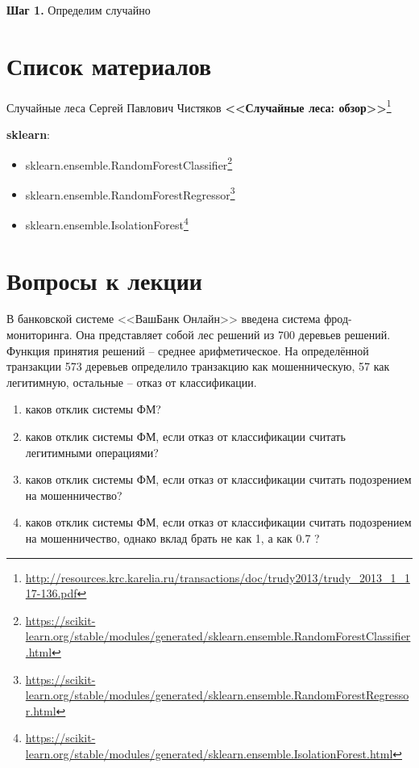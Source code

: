 \documentclass{beamer}
\begin{document}
\begin{frame}
\textbf{Шаг 1.} Определим случайно 

\end{frame}
  
  
  \section{Список материалов}
  
  \begin{frame}{Случайные леса}
  Сергей Павлович Чистяков \textbf{<<Случайные леса: обзор>>}\footnote{\tiny
\url{http://resources.krc.karelia.ru/transactions/doc/trudy2013/trudy_2013_1_117-136.pdf}
}

	\textbf{sklearn}:
	\begin{itemize}
		\item sklearn.ensemble.RandomForestClassifier\footnote{
			\tiny \url{https://scikit-learn.org/stable/modules/generated/sklearn.ensemble.RandomForestClassifier.html}
		}
		\item sklearn.ensemble.RandomForestRegressor\footnote{
			\tiny
			\url{https://scikit-learn.org/stable/modules/generated/sklearn.ensemble.RandomForestRegressor.html}
		}
	    \item sklearn.ensemble.IsolationForest\footnote{
	       \tiny
	       \url{https://scikit-learn.org/stable/modules/generated/sklearn.ensemble.IsolationForest.html}
    	}
	\end{itemize}
  \end{frame}
  
  \section{Вопросы к лекции}
  
  \begin{frame}
  В банковской системе <<ВашБанк Онлайн>> введена система фрод-мониторинга. 
  Она представляет собой лес решений из 700 деревьев решений. Функция принятия решений -- среднее арифметическое. На определённой транзакции 573 деревьев определило транзакцию как мошенническую, 57 как легитимную, остальные -- отказ от классификации.
  \begin{enumerate}
     \item каков отклик системы ФМ?
     \item каков отклик системы ФМ, если отказ от классификации считать легитимными операциями?
     \item каков отклик системы ФМ, если отказ от классификации считать подозрением на мошенничество?
     \item каков отклик системы ФМ, если отказ от классификации считать подозрением на мошенничество, однако вклад брать не как 1, а как 0.7 ?
  \end{enumerate}
  
  \end{frame}
\end{document}

